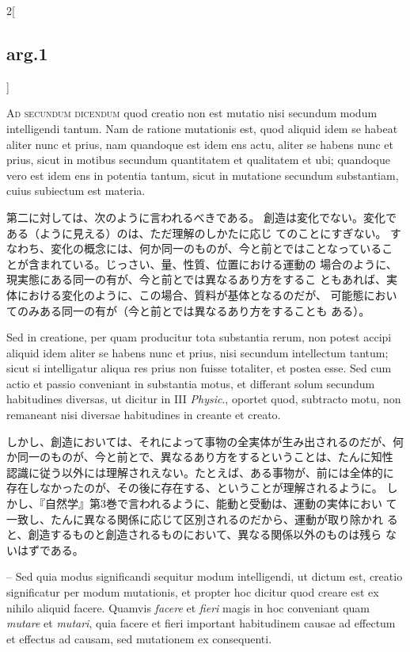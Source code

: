 \documentclass[paper=a4paper,fontsize=10pt,jafontsize=9pt,titlepage]{jlreq}
\begin{document}
\begin{paracol}{2}[\subsection{arg.1}]
\switchcolumn*[\subsection{ad.2}]

{\scshape Ad secundum dicendum} quod creatio non est mutatio nisi secundum modum
 intelligendi tantum. Nam de ratione mutationis est, quod aliquid idem
 se habeat aliter nunc et prius, nam quandoque est idem ens actu, aliter
 se habens nunc et prius, sicut in motibus secundum quantitatem et
 qualitatem et ubi; quandoque vero est idem ens in potentia tantum,
 sicut in mutatione secundum substantiam, cuius subiectum est
 materia.

\switchcolumn

第二に対しては、次のように言われるべきである。
創造は変化でない。変化である（ように見える）のは、ただ理解のしかたに応じ
 てのことにすぎない。
すなわち、変化の概念には、何か同一のものが、今と前とではことなっているこ
 とが含まれている。じっさい、量、性質、位置における運動の
 場合のように、現実態にある同一の有が、今と前とでは異なるあり方をするこ
 ともあれば、実体における変化のように、この場合、質料が基体となるのだが、
 可能態においてのみある同一の有が（今と前とでは異なるあり方をすることも
 ある）。

\switchcolumn*

Sed in creatione, per quam producitur tota substantia rerum,
 non potest accipi aliquid idem aliter se habens nunc et prius, nisi
 secundum intellectum tantum; sicut si intelligatur aliqua res prius non
 fuisse totaliter, et postea esse. Sed cum actio et passio conveniant in
 substantia motus, et differant solum secundum habitudines diversas, ut
 dicitur in III {\itshape Physic}., oportet quod, subtracto motu, non remaneant
 nisi diversae habitudines in creante et creato.

\switchcolumn

しかし、創造においては、それによって事物の全実体が生み出されるのだが、何
 か同一のものが、今と前とで、異なるあり方をするということは、たんに知性
 認識に従う以外には理解されえない。たとえば、ある事物が、前には全体的に
 存在しなかったのが、その後に存在する、ということが理解されるように。
しかし、『自然学』第3巻で言われるように、能動と受動は、運動の実体におい
 て一致し、たんに異なる関係に応じて区別されるのだから、運動が取り除かれ
 ると、創造するものと創造されるものにおいて、異なる関係以外のものは残ら
 ないはずである。

\switchcolumn*

-- Sed quia modus significandi sequitur modum intelligendi, ut dictum
 est, creatio significatur per modum mutationis, et propter hoc dicitur
 quod creare est ex nihilo aliquid facere. Quamvis {\itshape facere} et
 {\itshape fieri} magis in hoc conveniant quam {\itshape mutare} et
 {\itshape mutari}, quia facere et fieri important habitudinem causae ad
 effectum et effectus ad causam, sed mutationem ex consequenti.


\end{paracol}
\end{document}
